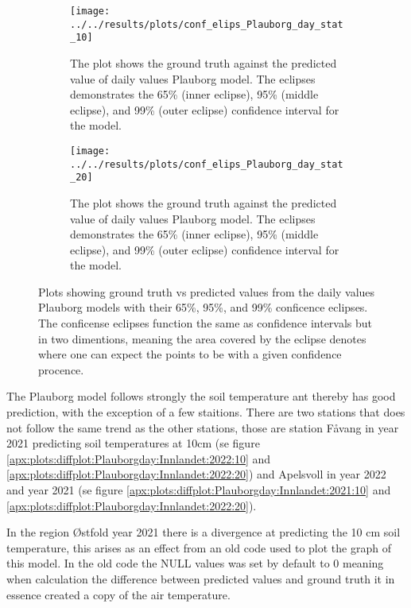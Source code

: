 \begin{figure}
	\begin{subfigure}{0.45\linewidth}
		\centering
		\texttt{[image: ../../results/plots/conf\_elips\_Plauborg\_day\_stat\_10]}
		\caption[Confidence eclipse of daily values Plauborg model 10cm]{The plot shows the ground truth against the predicted value of daily values Plauborg model. The eclipses demonstrates the 65\% (inner eclipse), 95\% (middle eclipse), and 99\% (outer eclipse) confidence interval for the model.}
		\label{fig:confelipsplauborgdaystat10}
	\end{subfigure}
	\begin{subfigure}{0.45\textwidth}
		\centering
		\texttt{[image: ../../results/plots/conf\_elips\_Plauborg\_day\_stat\_20]}
		\caption[Confidence eclipse of daily values Plauborg model 20cm]{The plot shows the ground truth against the predicted value of daily values Plauborg model. The eclipses demonstrates the 65\% (inner eclipse), 95\% (middle eclipse), and 99\% (outer eclipse) confidence interval for the model.}
		\label{fig:confelipsplauborgdaystat20}
	\end{subfigure}
	\caption{Plots showing ground truth vs predicted values from the daily values Plauborg models with their 65\%, 95\%, and 99\% conficence eclipses. The conficense eclipses function the same as confidence intervals but in two dimentions, meaning the area covered by the eclipse denotes where one can expect the points to be with a given confidence procence.}
\end{figure}


The Plauborg model follows strongly the soil temperature ant thereby has good prediction, with the exception of a few staitions. There are two stations that does not follow the same trend as the other stations, those are station Fåvang in year 2021 predicting soil temperatures at 10cm (se figure \ref{apx:plots:diffplot:Plauborgday:Innlandet:2022:10} and \ref{apx:plots:diffplot:Plauborgday:Innlandet:2022:20}) and Apelsvoll in year 2022 and year 2021 (se figure \ref{apx:plots:diffplot:Plauborgday:Innlandet:2021:10} and \ref{apx:plots:diffplot:Plauborgday:Innlandet:2022:20}). 


In the region Østfold year 2021 there is a divergence at predicting the 10 cm soil temperature, this arises as an effect from an old code used to plot the graph of this model. In the old code the NULL values was set by default to 0 meaning when calculation the difference between predicted values and ground truth it in essence created a copy of the air temperature.

